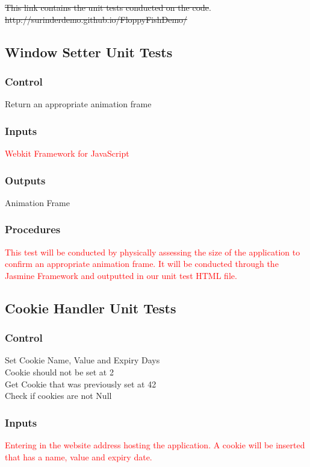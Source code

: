 \documentclass[11pt, oneside]{article}   	%
\begin{document}
\sout{This link contains the unit tests conducted on the code}.
\sout{http://surinderdemo.github.io/FloppyFishDemo/} 

\subsection{Window Setter Unit Tests}
\subsubsection{Control}
Return an appropriate animation frame

\subsubsection{Inputs}
\textcolor{red}{Webkit Framework for JavaScript}

\subsubsection{Outputs}
Animation Frame

\subsubsection{Procedures}
\textcolor{red}{This test will be conducted by physically assessing the size of the application to confirm an appropriate animation frame. It will be conducted through the Jasmine Framework and outputted in our unit test HTML file.}


\subsection{Cookie Handler Unit Tests}
\subsubsection{Control}
Set Cookie Name, Value and Expiry Days \\
Cookie should not be set at 2 \\ 
Get Cookie that was previously set at 42 \\
Check if cookies are not Null

\subsubsection{Inputs}
\textcolor{red}{Entering in the website address hosting the application. A  cookie will be inserted that has a name, value and expiry date.}
\end{document}
